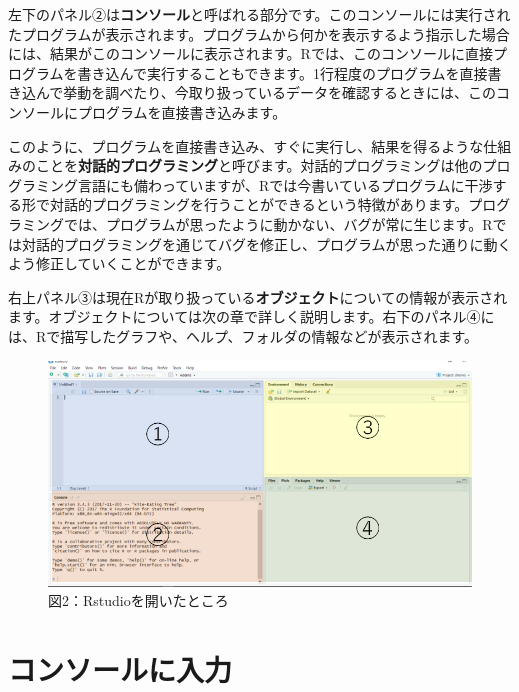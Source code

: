 \documentclass[
  letterpaper,
  DIV=11,
  numbers=noendperiod]{scrreprt}
\begin{document}
左下のパネル②は\textbf{コンソール}と呼ばれる部分です。このコンソールには実行されたプログラムが表示されます。プログラムから何かを表示するよう指示した場合には、結果がこのコンソールに表示されます。Rでは、このコンソールに直接プログラムを書き込んで実行することもできます。1行程度のプログラムを直接書き込んで挙動を調べたり、今取り扱っているデータを確認するときには、このコンソールにプログラムを直接書き込みます。

このように、プログラムを直接書き込み、すぐに実行し、結果を得るような仕組みのことを\textbf{対話的プログラミング}と呼びます。対話的プログラミングは他のプログラミング言語にも備わっていますが、Rでは今書いているプログラムに干渉する形で対話的プログラミングを行うことができるという特徴があります。プログラミングでは、プログラムが思ったように動かない、バグが常に生じます。Rでは対話的プログラミングを通じてバグを修正し、プログラムが思った通りに動くよう修正していくことができます。

右上パネル③は現在Rが取り扱っている\textbf{オブジェクト}についての情報が表示されます。オブジェクトについては次の章で詳しく説明します。右下のパネル④には、Rで描写したグラフや、ヘルプ、フォルダの情報などが表示されます。

\begin{figure}

{\centering \includegraphics{././image/Rstudio2.png}

}

\caption{図2：Rstudioを開いたところ}

\end{figure}

\hypertarget{ux30b3ux30f3ux30bdux30fcux30ebux306bux5165ux529b}{%
\section{コンソールに入力}\label{ux30b3ux30f3ux30bdux30fcux30ebux306bux5165ux529b}}
\end{document}
